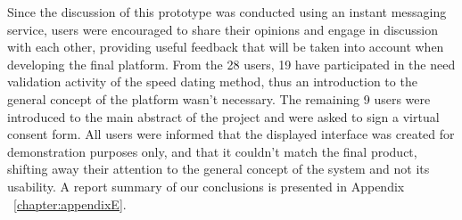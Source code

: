 {{Since the discussion of this prototype was conducted using an instant messaging service, users were encouraged to share their opinions and engage in discussion with each other, providing useful feedback that will be taken into account when developing the final platform. From the 28 users, 19 have participated in the need validation activity of the speed dating method, thus an introduction to the general concept of the platform wasn't necessary. The remaining 9 users were introduced to the main abstract of the project and were asked to sign a virtual consent form. All users were informed that the displayed interface was created for demonstration purposes only, and that it couldn't match the final product, shifting away their attention to the general concept of the system and not its usability. A report summary of our conclusions is presented in Appendix ~\ref{chapter:appendixE}.


}}
